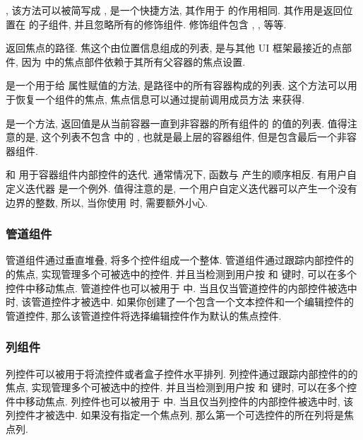 \indent{}, 该方法可以被简写成 , 是一个快捷方法, 其作用于  的作用相同. 其作用是返回位置在  的子组件, 并且忽略所有的修饰组件. 修饰组件包含 , ,  等等.

\indent{} 返回焦点的路径. 焦这个由位置信息组成的列表, 是与其他 UI 框架最接近的点部件, 因为 \urwid{} 中的焦点部件依赖于其所有父容器的焦点设置.

\indent{} 是一个用于给  属性赋值的方法,  是路径中的所有容器构成的列表. 这个方法可以用于恢复一个组件的焦点, 焦点信息可以通过提前调用成员方法  来获得.

\indent{} 是一个方法, 返回值是从当前容器一直到非容器的所有组件的  的值的列表. 值得注意的是, 这个列表不包含  中的 , 也就是最上层的容器组件, 但是包含最后一个非容器组件.

\indent{} 和  用于容器组件内部控件的迭代. 通常情况下,  函数与  产生的顺序相反. 有用户自定义迭代器  是一个例外. 值得注意的是, 一个用户自定义迭代器可以产生一个没有边界的整数, 所以, 当你使用  时, 需要额外小心.

\subsubsection{管道组件}
管道组件通过垂直堆叠, 将多个控件组成一个整体. 管道组件通过跟踪内部控件的的焦点, 实现管理多个可被选中的控件. 并且当检测到用户按  和  键时, 可以在多个控件中移动焦点. 管道控件也可以被用于  中. 当且仅当管道控件的内部控件被选中时, 该管道控件才被选中. 如果你创建了一个包含一个文本控件和一个编辑控件的管道控件, 那么该管道控件将选择编辑控件作为默认的焦点控件.

\subsubsection{列组件}
列控件可以被用于将流控件或者盒子控件水平排列. 列控件通过跟踪内部控件的的焦点, 实现管理多个可被选中的控件. 并且当检测到用户按  和  键时, 可以在多个控件中移动焦点. 列控件也可以被用于  中. 当且仅当列控件的内部控件被选中时, 该列控件才被选中. 如果没有指定一个焦点列, 那么第一个可选控件的所在列将是焦点列.

